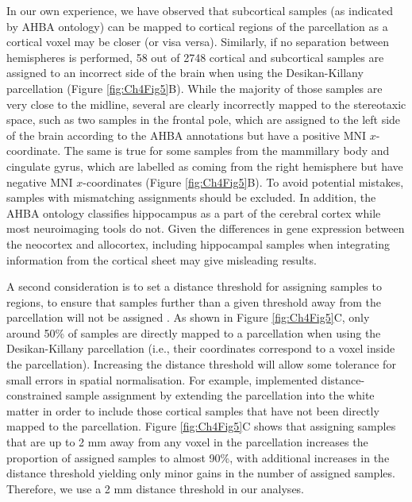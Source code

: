 In our own experience, we have observed that subcortical samples (as indicated by AHBA ontology) can be mapped to cortical regions of the parcellation as a cortical voxel may be closer (or visa versa). Similarly, if no separation between hemispheres is performed, 58 out of \num{2748} cortical and subcortical samples are assigned to an incorrect side of the brain when using the Desikan-Killany \citep{Desikan2006} parcellation (Figure \ref{fig:Ch4Fig5}B). While the majority of those samples are very close to the midline, several are clearly incorrectly mapped to the stereotaxic space, such as two samples in the frontal pole, which are assigned to the left side of the brain according to the AHBA annotations but have a positive MNI $x$-coordinate. The same is true for some samples from the mammillary body and cingulate gyrus, which are labelled as coming from the right hemisphere but have negative MNI $x$-coordinates (Figure \ref{fig:Ch4Fig5}B). To avoid potential mistakes, samples with mismatching assignments should be excluded. In addition, the AHBA ontology classifies hippocampus as a part of the cerebral cortex while most neuroimaging tools do not. Given the differences in gene expression between the neocortex and allocortex, including hippocampal samples when integrating information from the cortical sheet may give misleading results.

A second consideration is to set a distance threshold for assigning samples to regions, to ensure that samples further than a given threshold away from the parcellation will not be assigned \mbox{\citep{Romero-Garcia2018}}. As shown in Figure \ref{fig:Ch4Fig5}C, only around 50\% of samples are directly mapped to a parcellation when using the Desikan-Killany \citep{Desikan2006} parcellation (i.e., their coordinates correspond to a voxel inside the parcellation). Increasing the distance threshold will allow some tolerance for small errors in spatial normalisation. For example, \mbox{\citet{Romero-Garcia2018}} implemented distance-constrained sample assignment by extending the parcellation into the white matter in order to include those cortical samples that have not been directly mapped to the parcellation. Figure \ref{fig:Ch4Fig5}C shows that assigning samples that are up to 2 mm away from any voxel in the parcellation increases the proportion of assigned samples to almost 90\%, with additional increases in the distance threshold yielding only minor gains in the number of assigned samples. Therefore, we use a 2 mm distance threshold in our analyses.

